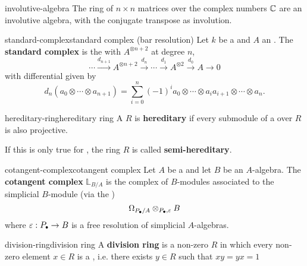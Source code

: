 \begin{example}{involutive-algebra}
    The ring of $n \times n$ matrices over the complex numbers $\mathbb{C}$ are an involutive algebra, with the conjugate transpose as involution.
\end{example}

\begin{topic}{standard-complex}{standard complex (bar resolution)}
    Let $k$ be a  and $A$ an . The \textbf{standard complex} is the  with $A^{\otimes n + 2}$ at degree $n$,
    \[ \cdots \xrightarrow{d_{n + 1}} A^{\otimes n + 2} \xrightarrow{d_n} \cdots \xrightarrow{d_1} A^{\otimes 2} \xrightarrow{d_0} A \to 0 \]
    with differential given by
    \[ d_n(a_0 \otimes \cdots \otimes a_{n + 1}) = \sum_{i = 0}^{n} (-1)^i a_0 \otimes \cdots \otimes a_i a_{i + 1} \otimes \cdots \otimes a_n . \]
\end{topic}

\begin{topic}{hereditary-ring}{hereditary ring}
    A  $R$ is \textbf{hereditary} if every submodule of a  over $R$ is also projective.
    
    If this is only true for , the ring $R$ is called \textbf{semi-hereditary}.
\end{topic}

\begin{topic}{cotangent-complex}{cotangent complex}
    Let $A$ be a  and let $B$ be an $A$-algebra. The \textbf{cotangent complex} $\mathbb{L}_{B/A}$ is the complex of $B$-modules associated to the simplicial $B$-module (via the )
    \[ \Omega_{P_\bdot/A} \otimes_{P_\bdot, \varepsilon} B \]
    where $\varepsilon : P_\bdot \to B$ is a free resolution of simplicial $A$-algebras.
\end{topic}


\begin{topic}{division-ring}{division ring}
    A \textbf{division ring} is a non-zero  $R$ in which every non-zero element $x \in R$ is a , i.e. there exists $y \in R$ such that $xy = yx = 1$
\end{topic}

